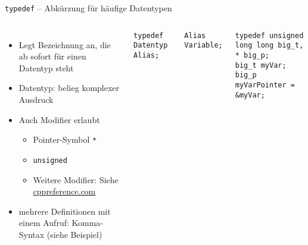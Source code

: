 
\begin{frame}[fragile]{\texttt{typedef} -- Abkürzung für häufige Datentypen}
%
\begin{columns}[T]
\begin{itemize}
\item Legt Bezeichnung an, die ab sofort für einen Datentyp steht
\item Datentyp: belieg komplexer Ausdruck
\item Auch Modifier erlaubt
	\begin{itemize}
	\item Pointer-Symbol \texttt{*}
	\item \texttt{unsigned}
	\item Weitere Modifier: Siehe \href{http://en.cppreference.com/w/c/language/declarations}{cppreference.com}
	\end{itemize}
\item mehrere Definitionen mit einem Aufruf: Komma-Syntax (siehe Beispiel)
\end{itemize}
%
\begin{codebox}
\begin{verbatim}
typedef Datentyp Alias;
\end{verbatim}
\end{codebox}
%
\begin{codebox}
\begin{verbatim}
Alias Variable;
\end{verbatim}
\end{codebox}
%
\begin{codebox}[Beispiel]
\begin{verbatim}
typedef unsigned long long big_t, * big_p;
big_t myVar;
big_p myVarPointer = &myVar;
\end{verbatim}
\end{codebox}
%
\end{columns}
%
\end{frame}


